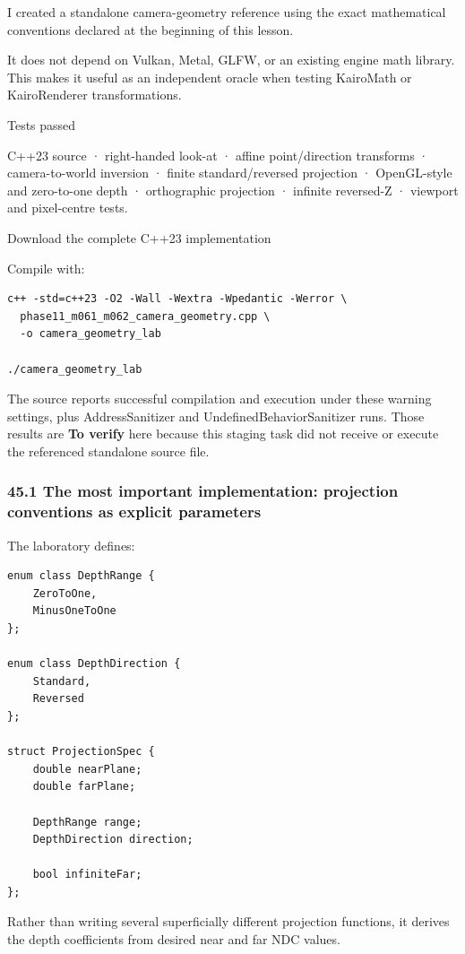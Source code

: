 I created a standalone camera-geometry reference using the exact mathematical conventions declared at the beginning of this lesson.

It does not depend on Vulkan, Metal, GLFW, or an existing engine math library. This makes it useful as an independent oracle when testing KairoMath or KairoRenderer transformations.

Tests passed

C++23 source · right-handed look-at · affine point/direction transforms · camera-to-world inversion · finite standard/reversed projection · OpenGL-style and zero-to-one depth · orthographic projection · infinite reversed-Z · viewport and pixel-centre tests.

Download the complete C++23 implementation

Compile with:

\begin{verbatim}
c++ -std=c++23 -O2 -Wall -Wextra -Wpedantic -Werror \
  phase11_m061_m062_camera_geometry.cpp \
  -o camera_geometry_lab

./camera_geometry_lab
\end{verbatim}

The source reports successful compilation and execution under these warning settings, plus AddressSanitizer and UndefinedBehaviorSanitizer runs. Those results are \textbf{To verify} here because this staging task did not receive or execute the referenced standalone source file.

\subsubsection{45.1 The most important implementation: projection conventions as explicit parameters}\label{the-most-important-implementation-projection-conventions-as-explicit-parameters}

The laboratory defines:

\begin{verbatim}
enum class DepthRange {
    ZeroToOne,
    MinusOneToOne
};

enum class DepthDirection {
    Standard,
    Reversed
};

struct ProjectionSpec {
    double nearPlane;
    double farPlane;

    DepthRange range;
    DepthDirection direction;

    bool infiniteFar;
};
\end{verbatim}

Rather than writing several superficially different projection functions, it derives the depth coefficients from desired near and far NDC values.

